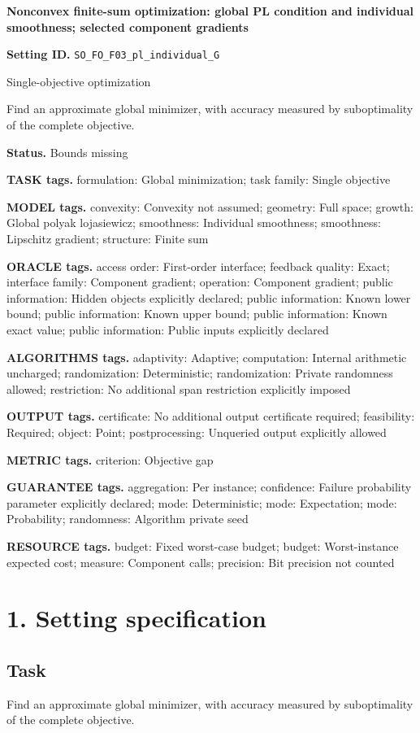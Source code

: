 \documentclass[10pt,a4paper]{article}
\begin{document}
\raggedright

{\LARGE\bfseries\sffamily\color{AtlasNavy} Nonconvex finite-sum optimization: global PL condition and individual smoothness; selected component gradients\par}\vspace{5pt}
\textbf{Setting ID.} \texttt{SO\_\allowbreak{}FO\_\allowbreak{}F03\_\allowbreak{}pl\_\allowbreak{}individual\_\allowbreak{}G}

Single-objective optimization

Find an approximate global minimizer, with accuracy measured by suboptimality of the complete objective.

\textbf{Status.} Bounds missing

\textbf{TASK tags.} formulation: Global minimization; task family: Single objective

\textbf{MODEL tags.} convexity: Convexity not assumed; geometry: Full space; growth: Global polyak lojasiewicz; smoothness: Individual smoothness; smoothness: Lipschitz gradient; structure: Finite sum

\textbf{ORACLE tags.} access order: First-order interface; feedback quality: Exact; interface family: Component gradient; operation: Component gradient; public information: Hidden objects explicitly declared; public information: Known lower bound; public information: Known upper bound; public information: Known exact value; public information: Public inputs explicitly declared

\textbf{ALGORITHMS tags.} adaptivity: Adaptive; computation: Internal arithmetic uncharged; randomization: Deterministic; randomization: Private randomness allowed; restriction: No additional span restriction explicitly imposed

\textbf{OUTPUT tags.} certificate: No additional output certificate required; feasibility: Required; object: Point; postprocessing: Unqueried output explicitly allowed

\textbf{METRIC tags.} criterion: Objective gap

\textbf{GUARANTEE tags.} aggregation: Per instance; confidence: Failure probability parameter explicitly declared; mode: Deterministic; mode: Expectation; mode: Probability; randomness: Algorithm private seed

\textbf{RESOURCE tags.} budget: Fixed worst-case budget; budget: Worst-instance expected cost; measure: Component calls; precision: Bit precision not counted

\section{1. Setting specification}
\subsection{Task}
Find an approximate global minimizer, with accuracy measured by suboptimality of the complete objective.
\end{document}
